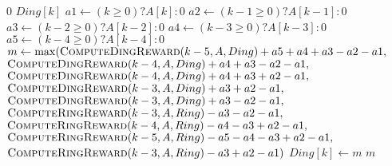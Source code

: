 \documentclass{article}
\begin{document}
\begin{algorithm}
\begin{algorithmic}[1]
        \State \Return $0$
        \State \Return $Ding[k]$
    \Else
        \State $a1 \gets (k \geq 0) ? A[k] : 0$
        \State $a2 \gets (k - 1 \geq 0) ? A[k - 1] : 0$
        \State $a3 \gets (k - 2 \geq 0) ? A[k - 2] : 0$
        \State $a4 \gets (k - 3 \geq 0) ? A[k - 3] : 0$
        \State $a5 \gets (k - 4 \geq 0) ? A[k - 4] : 0$
        \State $m \gets \max(\Call{ComputeDingReward}{k - 5, A, Ding} + a5 + a4 + a3 - a2 - a1,$
        \State \hspace{1.5em} $\Call{ComputeDingReward}{k - 4, A, Ding} + a4 + a3 - a2 - a1,$
        \State \hspace{1.5em} $\Call{ComputeDingReward}{k - 4, A, Ding} + a4 + a3 + a2 - a1,$
        \State \hspace{1.5em} $\Call{ComputeDingReward}{k - 3, A, Ding} + a3 + a2 - a1,$
        \State \hspace{1.5em} $\Call{ComputeDingReward}{k - 3, A, Ding} + a3 - a2 - a1,$
        \State \hspace{1.5em} $\Call{ComputeRingReward}{k - 3, A, Ring} - a3 - a2 - a1,$
        \State \hspace{1.5em} $\Call{ComputeRingReward}{k - 4, A, Ring} - a4 - a3 + a2 - a1,$
        \State \hspace{1.5em} $\Call{ComputeRingReward}{k - 5, A, Ring} - a5 - a4 - a3 + a2 - a1,$
        \State \hspace{1.5em} $\Call{ComputeRingReward}{k - 3, A, Ring} - a3 + a2 - a1)$
        \State $Ding[k] \gets m$
        \State \Return $m$
    \EndIf
\EndProcedure

\end{algorithmic}
\end{algorithm}
\end{document}
